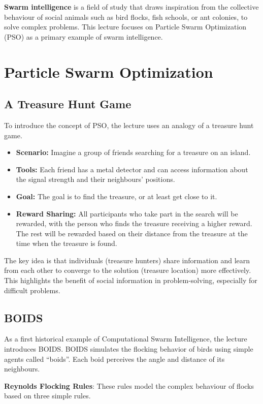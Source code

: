 \textbf{Swarm intelligence} is a field of study that draws inspiration from the collective behaviour of social animals such as bird flocks, fish schools, or ant colonies, to solve complex problems. This lecture focuses on Particle Swarm Optimization (PSO) as a primary example of swarm intelligence.

\section{Particle Swarm Optimization}
\subsection*{A Treasure Hunt Game}
To introduce the concept of PSO, the lecture uses an analogy of a treasure hunt game.

\begin{itemize}
    \item \textbf{Scenario:} Imagine a group of friends searching for a treasure on an island.
    \item \textbf{Tools:} Each friend has a metal detector and can access information about the signal strength and their neighbours' positions.
    \item \textbf{Goal:} The goal is to find the treasure, or at least get close to it.
    \item \textbf{Reward Sharing:} All participants who take part in the search will be rewarded, with the person who finds the treasure receiving a higher reward. The rest will be rewarded based on their distance from the treasure at the time when the treasure is found.
\end{itemize}

The key idea is that individuals (treasure hunters) share information and learn from each other to converge to the solution (treasure location) more effectively. This highlights the benefit of social information in problem-solving, especially for difficult problems.

\subsection*{BOIDS}
As a first historical example of Computational Swarm Intelligence, the lecture introduces BOIDS. BOIDS simulates the flocking behavior of birds using simple agents called “boids”. Each boid perceives the angle and distance of its neighbours.

\textbf{Reynolds Flocking Rules}: These rules model the complex behaviour of flocks based on three simple rules.


